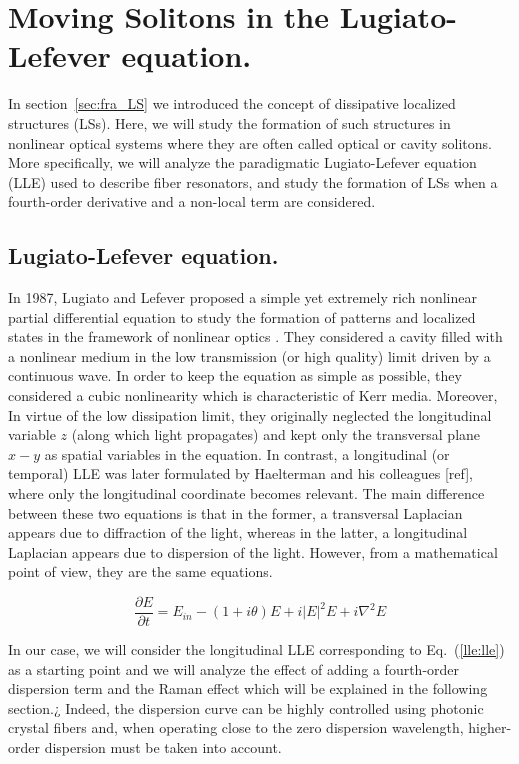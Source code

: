 \chapter{Moving Solitons in the Lugiato-Lefever equation.}

In section~\ref{sec:fra_LS} we introduced the concept of dissipative localized structures (LSs). Here, we will study the formation
of such structures in nonlinear optical systems where they are often called optical or cavity solitons. 
More specifically, we will analyze the paradigmatic Lugiato-Lefever equation (LLE) \cite{lugiatolefever1987} used to describe fiber resonators, and
study the formation of LSs when a fourth-order derivative and a non-local term are considered.


\section{Lugiato-Lefever equation.}

In 1987, Lugiato and Lefever proposed a simple yet extremely rich nonlinear partial differential equation to study the formation of patterns and localized states
in the framework of nonlinear optics \cite{lugiatolefever1987}. They considered a cavity filled with a nonlinear medium in the low transmission (or high quality) limit
driven by a continuous wave. In order to keep the equation as simple as possible, they considered a cubic nonlinearity which is characteristic of Kerr media. Moreover,
In virtue of the low dissipation limit, they originally neglected the longitudinal variable $z$ (along which light propagates) and kept only the transversal plane $x-y$ as spatial
variables in the equation. In contrast, a longitudinal (or temporal) LLE was later formulated by Haelterman and his colleagues [ref], where only the longitudinal 
coordinate becomes relevant. The main difference between these two equations is that in the former, a transversal Laplacian appears due to diffraction of the light, whereas
in the latter, a longitudinal Laplacian appears due to dispersion of the light. However, from a mathematical point of view, they are the same equations.


\begin{equation}
    \dfrac{\partial E}{\partial t} = E_{in} - (1 + i\theta) E + i |E|^2 E + i\nabla^2 E
    \label{lle:lle}
\end{equation}

In our case, we will consider the longitudinal LLE corresponding to Eq.~(\ref{lle:lle}) as a starting point and we will analyze
the effect of adding a fourth-order dispersion term and the Raman effect which will be explained in the following section.¿
Indeed, the dispersion curve can be highly controlled using photonic crystal fibers and, when operating
close to the zero dispersion wavelength, higher-order dispersion must be taken into account.

